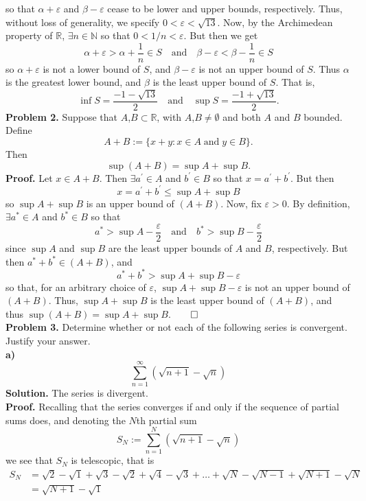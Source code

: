 \documentclass[11pt, letterpaper]{article}
\newcommand{\mbb}[1]{\mathbb{#1}}
\begin{document}
    so that $\alpha+\varepsilon$ and $\beta-\varepsilon$ cease to be lower and upper bounds, respectively. Thus, without loss of generality, we specify $0<\varepsilon<\sqrt{13}$.
    Now, by the Archimedean property of $\mbb{R}$, $\exists n\in\mbb{N}$ so that $0<1/n<\varepsilon$. But then we get
    \[\alpha+\varepsilon>\alpha+\frac{1}{n}\in S\quad\text{and}\quad\beta-\varepsilon<\beta-\frac{1}{n}\in S\]
    so $\alpha+\varepsilon$ is not a lower bound of $S$, and $\beta-\varepsilon$ is not an upper bound of $S$. Thus $\alpha$ is the greatest lower bound, and $\beta$ is the least upper bound of $S$. That is,
    \[\inf S=\frac{-1-\sqrt{13}}{2}\quad\text{and}\quad\sup S=\frac{-1+\sqrt{13}}{2}.\tag*{$\qed$}\]
    {\bf Problem 2.} Suppose that $A$,$B\subset\mbb{R}$, with $A$,$B\neq\emptyset$ and both $A$ and $B$ bounded. Define
    \[A+B:=\{x+y:x\in A\;\text{and}\;y\in B\}.\]
    Then
    \[\sup(A+B)=\sup A+\sup B.\]
    {\bf Proof.} Let $x\in A+B$. Then $\exists a^\prime\in A$ and $b^\prime\in B$ so that $x=a^\prime+b^\prime$. But then
    \[x=a^\prime+b^\prime\leq\sup A+\sup B\]
    so $\sup A+\sup B$ is an upper bound of $(A+B)$. Now, fix $\varepsilon>0$. By definition, $\exists a^\ast\in A$ and $b^\ast\in B$ so that
    \[a^\ast>\sup A-\frac{\varepsilon}{2}\quad\text{and}\quad b^\ast>\sup B-\frac{\varepsilon}{2}\]
    since $\sup A$ and $\sup B$ are the least upper bounds of $A$ and $B$, respectively. But then $a^\ast+b^\ast\in(A+B)$, and
    \[a^\ast+b^\ast>\sup A+\sup B -\varepsilon\]
    so that, for an arbitrary choice of $\varepsilon$, $\sup A+\sup B-\varepsilon$ is not an upper bound of $(A+B)$. Thus, $\sup A+\sup B$ is the least upper bound of $(A+B)$, and
    thus $\sup(A+B)=\sup A+\sup B$.\hfill{$\qed$}\\[10pt]
    {\bf Problem 3.} Determine whether or not each of the following series is convergent. Justify your answer.\\[10pt]
    {\bf a)} 
    \[\sum_{n=1}^\infty(\sqrt{n+1}-\sqrt{n})\]
    {\bf Solution.} The series is divergent.\\[10pt]
    {\bf Proof.} Recalling that the series converges if and only if the sequence of partial sums does, and denoting the $N$th partial sum
    \[S_N:=\sum_{n=1}^N(\sqrt{n+1}-\sqrt{n})\]
    we see that $S_N$ is telescopic, that is
    \begin{align*}
        S_N&=\sqrt{2}-\sqrt{1}+\sqrt{3}-\sqrt{2}+\sqrt{4}-\sqrt{3}+\dots+\sqrt{N}-\sqrt{N-1}+\sqrt{N+1}-\sqrt{N}\\
        &=\sqrt{N+1}-\sqrt{1}
    \end{align*}
\end{document}
